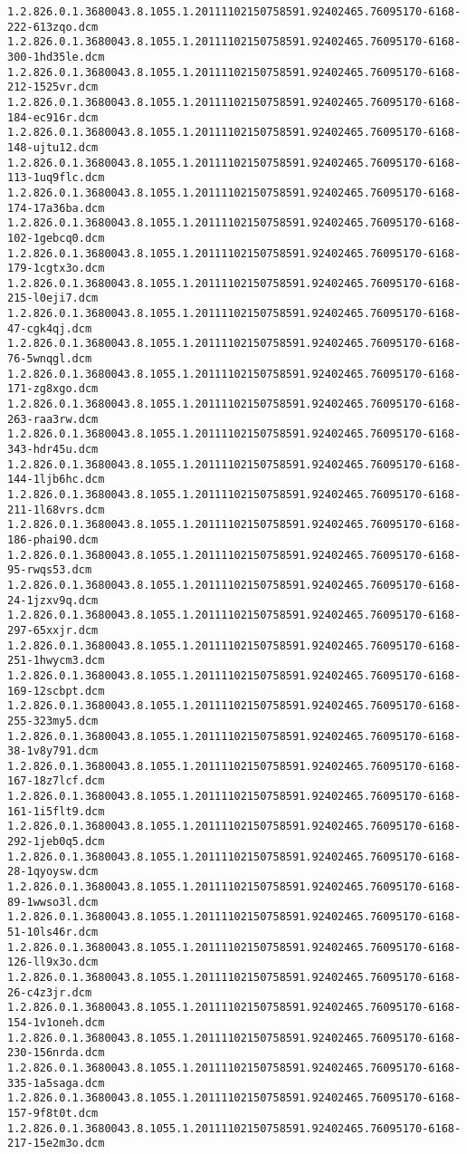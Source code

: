 \begin{lstlisting}
1.2.826.0.1.3680043.8.1055.1.20111102150758591.92402465.76095170-6168-222-613zqo.dcm 1.2.826.0.1.3680043.8.1055.1.20111102150758591.92402465.76095170-6168-300-1hd35le.dcm 1.2.826.0.1.3680043.8.1055.1.20111102150758591.92402465.76095170-6168-212-1525vr.dcm 1.2.826.0.1.3680043.8.1055.1.20111102150758591.92402465.76095170-6168-184-ec916r.dcm 1.2.826.0.1.3680043.8.1055.1.20111102150758591.92402465.76095170-6168-148-ujtu12.dcm 1.2.826.0.1.3680043.8.1055.1.20111102150758591.92402465.76095170-6168-113-1uq9flc.dcm 1.2.826.0.1.3680043.8.1055.1.20111102150758591.92402465.76095170-6168-174-17a36ba.dcm 1.2.826.0.1.3680043.8.1055.1.20111102150758591.92402465.76095170-6168-102-1gebcq0.dcm 1.2.826.0.1.3680043.8.1055.1.20111102150758591.92402465.76095170-6168-179-1cgtx3o.dcm 1.2.826.0.1.3680043.8.1055.1.20111102150758591.92402465.76095170-6168-215-l0eji7.dcm 1.2.826.0.1.3680043.8.1055.1.20111102150758591.92402465.76095170-6168-47-cgk4qj.dcm 1.2.826.0.1.3680043.8.1055.1.20111102150758591.92402465.76095170-6168-76-5wnqgl.dcm 1.2.826.0.1.3680043.8.1055.1.20111102150758591.92402465.76095170-6168-171-zg8xgo.dcm 1.2.826.0.1.3680043.8.1055.1.20111102150758591.92402465.76095170-6168-263-raa3rw.dcm 1.2.826.0.1.3680043.8.1055.1.20111102150758591.92402465.76095170-6168-343-hdr45u.dcm 1.2.826.0.1.3680043.8.1055.1.20111102150758591.92402465.76095170-6168-144-1ljb6hc.dcm 1.2.826.0.1.3680043.8.1055.1.20111102150758591.92402465.76095170-6168-211-1l68vrs.dcm 1.2.826.0.1.3680043.8.1055.1.20111102150758591.92402465.76095170-6168-186-phai90.dcm 1.2.826.0.1.3680043.8.1055.1.20111102150758591.92402465.76095170-6168-95-rwqs53.dcm 1.2.826.0.1.3680043.8.1055.1.20111102150758591.92402465.76095170-6168-24-1jzxv9q.dcm 1.2.826.0.1.3680043.8.1055.1.20111102150758591.92402465.76095170-6168-297-65xxjr.dcm 1.2.826.0.1.3680043.8.1055.1.20111102150758591.92402465.76095170-6168-251-1hwycm3.dcm 1.2.826.0.1.3680043.8.1055.1.20111102150758591.92402465.76095170-6168-169-12scbpt.dcm 1.2.826.0.1.3680043.8.1055.1.20111102150758591.92402465.76095170-6168-255-323my5.dcm 1.2.826.0.1.3680043.8.1055.1.20111102150758591.92402465.76095170-6168-38-1v8y791.dcm 1.2.826.0.1.3680043.8.1055.1.20111102150758591.92402465.76095170-6168-167-18z7lcf.dcm 1.2.826.0.1.3680043.8.1055.1.20111102150758591.92402465.76095170-6168-161-1i5flt9.dcm 1.2.826.0.1.3680043.8.1055.1.20111102150758591.92402465.76095170-6168-292-1jeb0q5.dcm 1.2.826.0.1.3680043.8.1055.1.20111102150758591.92402465.76095170-6168-28-1qyoysw.dcm 1.2.826.0.1.3680043.8.1055.1.20111102150758591.92402465.76095170-6168-89-1wwso3l.dcm 1.2.826.0.1.3680043.8.1055.1.20111102150758591.92402465.76095170-6168-51-10ls46r.dcm 1.2.826.0.1.3680043.8.1055.1.20111102150758591.92402465.76095170-6168-126-ll9x3o.dcm 1.2.826.0.1.3680043.8.1055.1.20111102150758591.92402465.76095170-6168-26-c4z3jr.dcm 1.2.826.0.1.3680043.8.1055.1.20111102150758591.92402465.76095170-6168-154-1v1oneh.dcm 1.2.826.0.1.3680043.8.1055.1.20111102150758591.92402465.76095170-6168-230-156nrda.dcm 1.2.826.0.1.3680043.8.1055.1.20111102150758591.92402465.76095170-6168-335-1a5saga.dcm 1.2.826.0.1.3680043.8.1055.1.20111102150758591.92402465.76095170-6168-157-9f8t0t.dcm 1.2.826.0.1.3680043.8.1055.1.20111102150758591.92402465.76095170-6168-217-15e2m3o.dcm 
\end{lstlisting}

